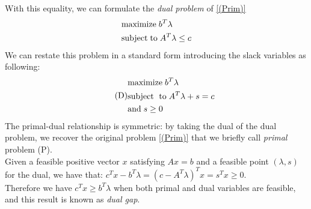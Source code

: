 \documentclass[a4paper,10 pt,titlepage,twoside]{book}
\theoremstyle{plain}
\theoremstyle{definition}
\theoremstyle{remark}
\begin{document}
With this equality, we can formulate the \textit{dual problem} of \ref{(Prim)}
\begin{equation}\label{Dual}
\begin{split}
&\text{maximize\;} b^{T}\lambda\\
&\text{subject\;to\;}A^{T}\lambda \leq c
\end{split}
\end{equation} 
We can restate this problem in a standard form introducing the slack variables as following:
\begin{equation}\tag{D}
\begin{split}
&\text{maximize\;}b^{T}\lambda\\
&\text{subject\; to\;}A^{T}\lambda+s=c\\ &\text{and\;} s\geq0
\end{split}
\end{equation}
The primal-dual relationship is symmetric: by taking the dual of the dual problem, we recover the original problem \ref{(Prim)} that we briefly call \textit{primal} problem (P).\\
Given a feasible positive vector $x$ satisfying $Ax=b$ and a feasible point $\left(\lambda,s\right)$ for the dual, we have that: $c^{T}x-b^{T}\lambda=\left(c-A^{T}\lambda\right)^{T}x=s^{T}x \geq0$.\\
Therefore we have $c^{T}x\geq b^{T}\lambda$ when both primal and dual variables are feasible, and this result is known as \textit{dual gap}.\\
\end{document}
